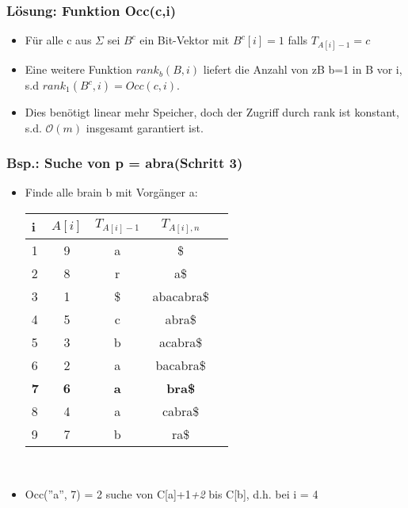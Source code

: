 \documentclass{beamer}
\begin{document}
\begin{frame}
\frametitle{Lösung: Funktion Occ(c,i)}
\begin{itemize}
\item Für alle c aus $\Sigma$ sei $B^{c}$ ein Bit-Vektor mit $B^{c}[i] = 1$ falls $T_{A[i]-1} = c$
\item Eine weitere Funktion $rank_{b}(B,i)$ liefert die Anzahl von zB b=1 in B vor i, s.d $rank_{1}(B^{c},i) = Occ(c,i)$.
\item Dies benötigt linear mehr Speicher, doch der Zugriff durch rank ist konstant, s.d. $\mathcal{O}(m)$ insgesamt garantiert ist.
\end{itemize}
\end{frame}
\begin{frame}
\frametitle{Bsp.: Suche von p = \glqq abra\grqq (Schritt 3)}
\begin{itemize}
\item Finde alle bra\grqq  in b mit Vorgänger \glqq a\grqq:\\[5mm]
\begin{tabular}{l<{\ttfamily}|c<{\ttfamily} c<{\ttfamily}c<{\ttfamily} l<{\ttfamily}}
\textbf{i} & $A[i]$ & $T_{A[i]-1}$ & $T_{A[i],n}$\\\hline
1 & 9 & \color{red}a \color{black}& \$ \\
2 & 8 & r & a\$ \\
3 & 1 & \$ & abacabra\$ \\
4 & 5 & c & abra\$ \\
5 & 3 & b & acabra\$ \\
6 & 2 & \color{red}a & \color{black}bacabra\$ \\
\textbf{7} & \textbf{6}  & \color{red}\textbf{a} & \textbf{bra\$} \\
8 & 4 & a & cabra\$ \\
9 & 7 & b & ra\$ \\
\end{tabular}\\[5mm]
\item Occ(''a'', 7) = 2 \textrightarrow suche von C[\glqq a\grqq]+1\textit{+2} bis C[\glqq b\grqq], d.h. bei i = 4
\end{itemize}
\end{frame}
\end{document}
